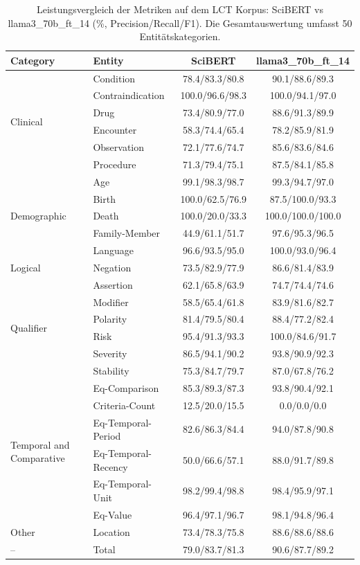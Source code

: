 
\begin{table}[htbp]
\centering
\begin{tabular}{llcc}
\toprule
\textbf{Category} & \textbf{Entity} & \textbf{SciBERT} & \textbf{llama3_70b_ft_14} \\
\midrule
\multirow{6}{*}{Clinical} & Condition & 78.4/83.3/80.8 & 90.1/88.6/89.3 \\
 & Contraindication & 100.0/96.6/98.3 & 100.0/94.1/97.0 \\
 & Drug & 73.4/80.9/77.0 & 88.6/91.3/89.9 \\
 & Encounter & 58.3/74.4/65.4 & 78.2/85.9/81.9 \\
 & Observation & 72.1/77.6/74.7 & 85.6/83.6/84.6 \\
 & Procedure & 71.3/79.4/75.1 & 87.5/84.1/85.8 \\
\midrule
\multirow{5}{*}{Demographic} & Age & 99.1/98.3/98.7 & 99.3/94.7/97.0 \\
 & Birth & 100.0/62.5/76.9 & 87.5/100.0/93.3 \\
 & Death & 100.0/20.0/33.3 & 100.0/100.0/100.0 \\
 & Family-Member & 44.9/61.1/51.7 & 97.6/95.3/96.5 \\
 & Language & 96.6/93.5/95.0 & 100.0/93.0/96.4 \\
\midrule
Logical & Negation & 73.5/82.9/77.9 & 86.6/81.4/83.9 \\
\midrule
\multirow{6}{*}{Qualifier} & Assertion & 62.1/65.8/63.9 & 74.7/74.4/74.6 \\
 & Modifier & 58.5/65.4/61.8 & 83.9/81.6/82.7 \\
 & Polarity & 81.4/79.5/80.4 & 88.4/77.2/82.4 \\
 & Risk & 95.4/91.3/93.3 & 100.0/84.6/91.7 \\
 & Severity & 86.5/94.1/90.2 & 93.8/90.9/92.3 \\
 & Stability & 75.3/84.7/79.7 & 87.0/67.8/76.2 \\
\midrule
\multirow{6}{*}{Temporal and Comparative} & Eq-Comparison & 85.3/89.3/87.3 & 93.8/90.4/92.1 \\
 & Criteria-Count & 12.5/20.0/15.5 & 0.0/0.0/0.0 \\
 & Eq-Temporal-Period & 82.6/86.3/84.4 & 94.0/87.8/90.8 \\
 & Eq-Temporal-Recency & 50.0/66.6/57.1 & 88.0/91.7/89.8 \\
 & Eq-Temporal-Unit & 98.2/99.4/98.8 & 98.4/95.9/97.1 \\
 & Eq-Value & 96.4/97.1/96.7 & 98.1/94.8/96.4 \\
\midrule
Other & Location & 73.4/78.3/75.8 & 88.6/88.6/88.6 \\
\midrule
-- & Total & 79.0/83.7/81.3 & 90.6/87.7/89.2 \\
\bottomrule
\end{tabular}
\caption{Leistungsvergleich der Metriken auf dem LCT Korpus: SciBERT vs llama3_70b_ft_14 (\%, Precision/Recall/F1). Die Gesamtauswertung umfasst 50 Entitätskategorien.}
\label{tab:metrics_comparison}
\end{table}
    